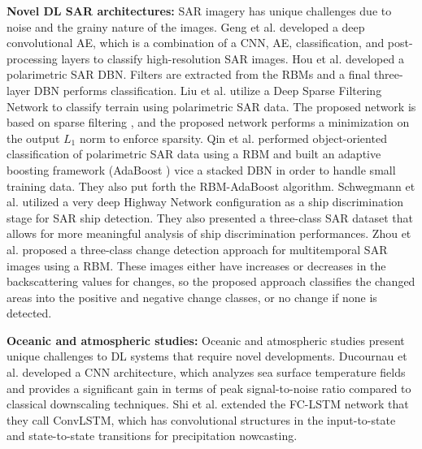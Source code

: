 \documentclass[12pt]{spieman}
\begin{document}
\begin{spacing}{1}
%
%
\textbf{Novel DL SAR architectures:} SAR imagery has unique challenges due to noise and the grainy nature of the images. Geng et al. \cite{Geng2015SAR} developed a deep convolutional AE, which is a combination of a CNN, AE, classification, and post-processing layers to classify high-resolution SAR images. Hou et al. \cite{Hou2015Polarimetric} developed a polarimetric SAR DBN. Filters are extracted from the RBMs and a final three-layer DBN performs classification. Liu et al. \cite{Liu2016Terrain} utilize a Deep Sparse Filtering Network to classify terrain using polarimetric SAR data. The proposed network is based on sparse filtering \cite{ngiam2011sparse} , and the proposed network performs a minimization on the output $L_{1}$ norm to enforce sparsity. Qin et al. \cite{qin2017object} performed object-oriented classification of polarimetric SAR data using a RBM and built an adaptive boosting framework (AdaBoost \cite{freund1995desicion} ) vice a stacked DBN in order to handle small training data. They also put forth the RBM-AdaBoost algorithm. Schwegmann et al. \cite{schwegmann2016very} utilized a very deep Highway Network configuration as a ship discrimination stage for SAR ship detection. They also presented a three-class SAR dataset that allows for more meaningful analysis of ship discrimination performances. Zhou et al. \cite{zhao2015three} proposed a three-class change detection approach for multitemporal SAR images using a RBM. These images either have increases or decreases in the backscattering values for changes, so the proposed approach classifies the changed areas into the positive and negative change classes, or no change if none is detected.


%
%
\textbf{Oceanic and atmospheric studies:} Oceanic and atmospheric studies present unique challenges to DL systems that require novel developments. Ducournau et al. \cite{Ducournau2016Deep} developed a CNN architecture, which analyzes sea surface temperature fields and provides a significant gain in terms of peak signal-to-noise ratio compared to classical downscaling techniques. Shi et al. \cite{Shi2015Convolutional} extended the FC-LSTM network that they call ConvLSTM, which has convolutional structures in the input-to-state and state-to-state transitions for precipitation nowcasting.



\end{spacing}
\end{document}
